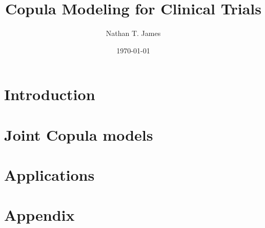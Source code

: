 \documentclass[11pt]{article}
\title{Copula Modeling for Clinical Trials}
\author{Nathan T. James}
\date{\today}
\begin{document}
	
\maketitle

\section{Introduction}\label{sec1}


\section{Joint Copula models}\label{sec2}


\section{Applications}\label{sec3}
%

   

\newpage
\section*{Appendix}\label{append}
  
\end{document}
